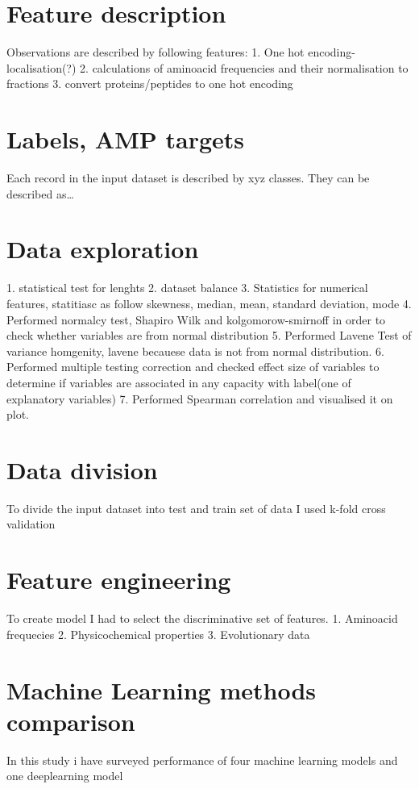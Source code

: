 \documentclass[a4paper,twoside,12pt]{book}
\begin{document}
\section{Feature description}
Observations are described by following features: 
1. One hot encoding-localisation(?)
2. calculations of aminoacid frequencies and their normalisation to fractions
3. convert proteins/peptides to one hot encoding

\section{Labels, AMP targets}
Each record in the input dataset is described by xyz classes. They can be described as…



\section{Data exploration}
1. statistical test for lenghts
2. dataset balance
3. Statistics for numerical features, statitiasc as follow skewness, median, mean, standard deviation, mode
4. Performed normalcy test, Shapiro Wilk and kolgomorow-smirnoff in order to check whether variables are from normal distribution
5. Performed Lavene Test of variance homgenity, lavene becauese data is not from normal distribution.
6. Performed multiple testing correction and checked effect size of variables to determine if variables are associated in any capacity with label(one of explanatory variables)
7. Performed Spearman correlation and visualised it on plot.

\section{Data division}
To divide the input dataset into test and train set of data I used k-fold cross validation

\section{Feature engineering}
To create model I had to select the discriminative set of features.
1. Aminoacid frequecies
2. Physicochemical properties
3. Evolutionary data

\section{Machine Learning methods comparison}
In this study i have surveyed performance of four machine learning models and one deeplearning model
\end{document}
